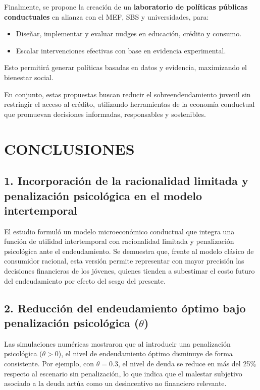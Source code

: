 \documentclass[10pt]{article}
\begin{document}
\begin{multicols}{2}
Finalmente, se propone la creación de un \textbf{laboratorio de políticas públicas conductuales} en alianza con el MEF, SBS y universidades, para:
\begin{itemize}
    \item Diseñar, implementar y evaluar nudges en educación, crédito y consumo.
    \item Escalar intervenciones efectivas con base en evidencia experimental.
\end{itemize}

Esto permitirá generar políticas basadas en datos y evidencia, maximizando el bienestar social.

\vspace{1em}

\noindent En conjunto, estas propuestas buscan reducir el sobreendeudamiento juvenil sin restringir el acceso al crédito, utilizando herramientas de la economía conductual que promuevan decisiones informadas, responsables y sostenibles.



\section{CONCLUSIONES}

\subsection*{1. Incorporación de la racionalidad limitada y penalización psicológica en el modelo intertemporal}
El estudio formuló un modelo microeconómico conductual que integra una función de utilidad intertemporal con racionalidad limitada y penalización psicológica ante el endeudamiento. Se demuestra que, frente al modelo clásico de consumidor racional, esta versión permite representar con mayor precisión las decisiones financieras de los jóvenes, quienes tienden a subestimar el costo futuro del endeudamiento por efecto del sesgo del presente.

\subsection*{2. Reducción del endeudamiento óptimo bajo penalización psicológica ($\theta$)}
Las simulaciones numéricas mostraron que al introducir una penalización psicológica ($\theta > 0$), el nivel de endeudamiento óptimo disminuye de forma consistente. Por ejemplo, con $\theta = 0.3$, el nivel de deuda se reduce en más del 25\% respecto al escenario sin penalización, lo que indica que el malestar subjetivo asociado a la deuda actúa como un desincentivo no financiero relevante.


\end{multicols}
\end{document}
